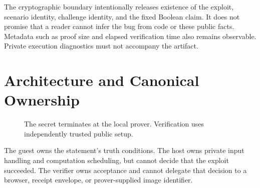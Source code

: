 \documentclass[11pt]{article}
\begin{document}
The cryptographic boundary intentionally releases existence of the exploit, scenario identity, challenge identity, and the fixed Boolean claim. It does not promise that a reader cannot infer the bug from code or these public facts. Metadata such as proof size and elapsed verification time also remains observable. Private execution diagnostics must not accompany the artifact.

\section{Architecture and Canonical Ownership}
\begin{figure}[htbp]
\centering
{}
\caption{The secret terminates at the local prover. Verification uses independently trusted public setup.}
\end{figure}

The guest owns the statement's truth conditions. The host owns private input handling and computation scheduling, but cannot decide that the exploit succeeded. The verifier owns acceptance and cannot delegate that decision to a browser, receipt envelope, or prover-supplied image identifier.
\end{document}
